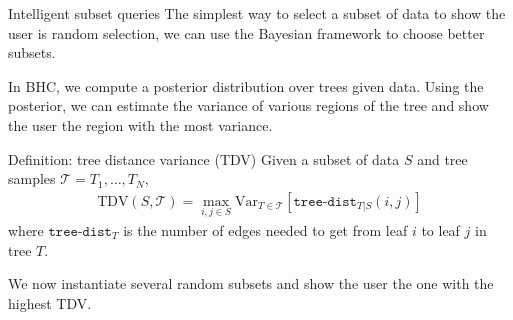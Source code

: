 \documentclass[10pt, compress]{beamer}
\begin{document}
\begin{frame}{Intelligent subset queries}
  The simplest way to select a subset of data
  to show the user is random selection,
  we can use the Bayesian framework to choose better subsets.

  In BHC, we compute a posterior distribution over
  trees given data. Using the posterior,
  we can estimate the variance
  of various regions of the tree and show the
  user the region with the most variance.

  \begin{block}{Definition: tree distance variance (TDV)}
    Given a subset of data $S$ and tree samples $\mathcal{T} = T_1, \ldots, T_N$,
    \begin{align}
      \mathrm{TDV}(S, \mathcal{T}) = \max_{i, j \in S}  \mathrm{Var}_{T \in \mathcal{T}}\left[\texttt{tree-dist}_{T|S}(i, j)\right]
    \end{align}
  where $\texttt{tree-dist}_T$ is the number of edges needed to get from leaf $i$ to leaf $j$
  in tree $T$.
  \end{block}

  We now instantiate several random subsets and show the user the one with the highest TDV.
\end{frame}
\end{document}

